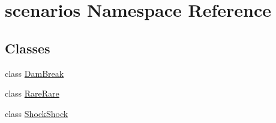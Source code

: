 \hypertarget{namespacescenarios}{}\section{scenarios Namespace Reference}
\label{namespacescenarios}
\subsection*{Classes}
\begin{DoxyCompactItemize}
\item 
class \hyperlink{classscenarios_1_1DamBreak}{Dam\+Break}
\item 
class \hyperlink{classscenarios_1_1RareRare}{Rare\+Rare}
\item 
class \hyperlink{classscenarios_1_1ShockShock}{Shock\+Shock}
\end{DoxyCompactItemize}
